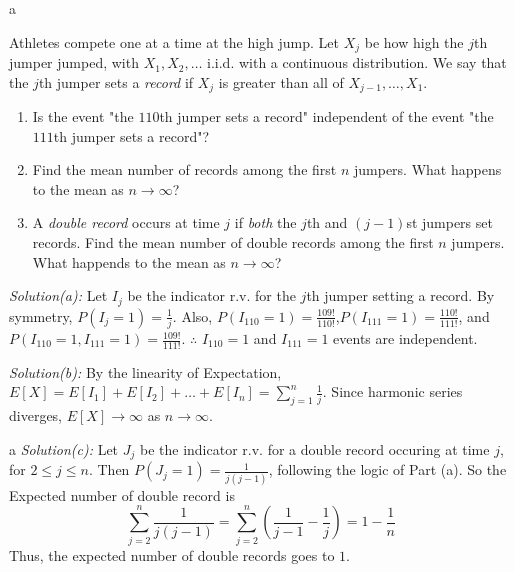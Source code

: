 \documentclass[8pt]{beamer}
\newcommand{\ti}[1]{\textit{#1}}
\begin{document}
\begin{frame}{a}
    \begin{example}[Records]
        Athletes compete one at a time at the high jump. Let $X_j$ be how high the $j$th jumper jumped, with $X_1, X_2, \dots$ i.i.d. with a continuous distribution. We say that the $j$th jumper sets a \ti{record} if $X_j$ is greater than all of $X_{j-1}, \dots, X_1$.

        \begin{enumerate}
            \item Is the event "the $110$th jumper sets a record" independent of the event "the $111$th jumper sets a record"?
            \item Find the mean number of records among the first $n$ jumpers. What happens to the mean as $n \rightarrow \infty$?
            \item A \ti{double record} occurs at time $j$ if \ti{both} the $j$th and $(j-1)$st jumpers set records. Find the mean number of double records among the first $n$ jumpers. What happends to the mean as $n \rightarrow \infty$?
        \end{enumerate}
        
        \ti{Solution(a):}
        Let $I_j$ be the indicator r.v. for the $j$th jumper setting a record. By symmetry, $P(I_j=1) = \frac{1}{j}$. Also, $P(I_{110}=1) = \frac{109!}{110!}$,$P(I_{111}=1) = \frac{110!}{111!}$, and $P(I_{110}=1, I_{111}=1) = \frac{109!}{111!}$. $\therefore$ $I_{110}=1$ and $I_{111}=1$ events are independent.

        \ti{Solution(b):}
        By the linearity of Expectation, $E[X] = E[I_1] + E[I_2] + \dots + E[I_n] = \sum_{j=1}^n \frac{1}{j}$. Since harmonic series diverges, $E[X] \rightarrow \infty$ as $n \rightarrow \infty$.
    \end{example}
\end{frame}

\begin{frame}{a}
    \ti{Solution(c):} Let $J_j$ be the indicator r.v. for a double record occuring at time $j$, for $2\leq j \leq n$. Then $P(J_j = 1) = \frac{1}{j(j-1)}$, following the logic of Part (a). So the Expected number of double record is 
    \[
    \sum_{j=2}^n \frac{1}{j(j-1)} = \sum_{j=2}^n \left( \frac{1}{j-1} - \frac{1}{j} \right) = 1- \frac{1}{n}
    \]
    Thus, the expected number of double records goes to $1$.
\end{frame}
\end{document}
